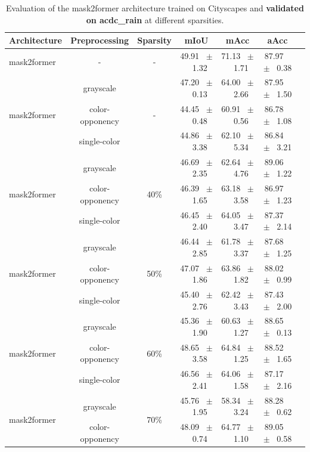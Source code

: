\begin{table}[h]
  \centering
  \caption{Evaluation of the mask2former architecture trained on Cityscapes and \textbf{validated on acdc_rain} at different sparsities.}
  \begin{tabular}{@{}lccc ccc@{}}
    \toprule
    Architecture & Preprocessing & Sparsity & mIoU & mAcc & aAcc \\
    \midrule
    mask2former & - & - & 49.91 ~$\pm$~ 1.32 & 71.13 ~$\pm$~ 1.71 & 87.97 ~$\pm$~ 0.38 \\
    \midrule
    \midrule
    \multirow{3}{*}{mask2former} & grayscale & \multirow{3}{*}{-} & 47.20 ~$\pm$~ 0.13 & 64.00 ~$\pm$~ 2.66 & 87.95 ~$\pm$~ 1.50 \\
    & color-opponency & & 44.45 ~$\pm$~ 0.48 & 60.91 ~$\pm$~ 0.56 & 86.78 ~$\pm$~ 1.08 \\
    & single-color & & 44.86 ~$\pm$~ 3.38 & 62.10 ~$\pm$~ 5.34 & 86.84 ~$\pm$~ 3.21 \\
    \midrule
    \multirow{3}{*}{mask2former} & grayscale & \multirow{3}{*}{40\%} & 46.69 ~$\pm$~ 2.35 & 62.64 ~$\pm$~ 4.76 & 89.06 ~$\pm$~ 1.22 \\
    & color-opponency & & 46.39 ~$\pm$~ 1.65 & 63.18 ~$\pm$~ 3.58 & 86.97 ~$\pm$~ 1.23 \\
    & single-color & & 46.45 ~$\pm$~ 2.40 & 64.05 ~$\pm$~ 3.47 & 87.37 ~$\pm$~ 2.14 \\
    \midrule
    \multirow{3}{*}{mask2former} & grayscale & \multirow{3}{*}{50\%} & 46.44 ~$\pm$~ 2.85 & 61.78 ~$\pm$~ 3.37 & 87.68 ~$\pm$~ 1.25 \\
    & color-opponency & & 47.07 ~$\pm$~ 1.86 & 63.86 ~$\pm$~ 1.82 & 88.02 ~$\pm$~ 0.99 \\
    & single-color & & 45.40 ~$\pm$~ 2.76 & 62.42 ~$\pm$~ 3.43 & 87.43 ~$\pm$~ 2.00 \\
    \midrule
    \multirow{3}{*}{mask2former} & grayscale & \multirow{3}{*}{60\%} & 45.36 ~$\pm$~ 1.90 & 60.63 ~$\pm$~ 1.27 & 88.65 ~$\pm$~ 0.13 \\
    & color-opponency & & 48.65 ~$\pm$~ 3.58 & 64.84 ~$\pm$~ 1.25 & 88.52 ~$\pm$~ 1.65 \\
    & single-color & & 46.56 ~$\pm$~ 2.41 & 64.06 ~$\pm$~ 1.58 & 87.17 ~$\pm$~ 2.16 \\
    \midrule
    \multirow{3}{*}{mask2former} & grayscale & \multirow{3}{*}{70\%} & 45.76 ~$\pm$~ 1.95 & 58.34 ~$\pm$~ 3.24 & 88.28 ~$\pm$~ 0.62 \\
    & color-opponency & & 48.09 ~$\pm$~ 0.74 & 64.77 ~$\pm$~ 1.10 & 89.05 ~$\pm$~ 0.58 \\

\end{tabular}
\end{table}
